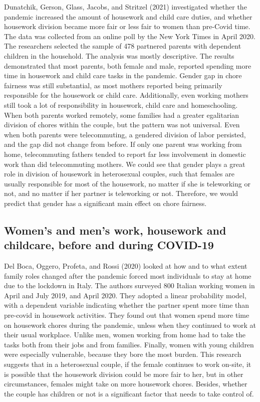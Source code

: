 \documentclass[
  english,
  man]{apa6}
\begin{document}
Dunatchik, Gerson, Glass, Jacobs, and Stritzel (2021) investigated whether the pandemic increased the amount of housework and child care duties, and whether housework division became more fair or less fair to women than pre-Covid time. The data was collected from an online poll by the New York Times in April 2020. The researchers selected the sample of 478 partnered parents with dependent children in the household. The analysis was mostly descriptive. The results demonstrated that most parents, both female and male, reported spending more time in housework and child care tasks in the pandemic. Gender gap in chore fairness was still substantial, as most mothers reported being primarily responsible for the housework or child care. Additionally, even working mothers still took a lot of responsibility in housework, child care and homeschooling. When both parents worked remotely, some families had a greater egalitarian division of chores within the couple, but the pattern was not universal. Even when both parents were telecommuting, a gendered division of labor persisted, and the gap did not change from before. If only one parent was working from home, telecommuting fathers tended to report far less involvement in domestic work than did telecommuting mothers. We could see that gender plays a great role in division of housework in heterosexual couples, such that females are usually responsible for most of the housework, no matter if she is teleworking or not, and no matter if her partner is teleworking or not. Therefore, we would predict that gender has a significant main effect on chore fairness.

\hypertarget{womens-and-mens-work-housework-and-childcare-before-and-during-covid-19}{%
\subsection{Women's and men's work, housework and childcare, before and during COVID-19}\label{womens-and-mens-work-housework-and-childcare-before-and-during-covid-19}}

Del Boca, Oggero, Profeta, and Rossi (2020) looked at how and to what extent family roles changed after the pandemic forced most individuals to stay at home due to the lockdown in Italy. The authors surveyed 800 Italian working women in April and July 2019, and April 2020. They adopted a linear probability model, with a dependent variable indicating whether the partner spent more time than pre-covid in housework activities. They found out that women spend more time on housework chores during the pandemic, unless when they continued to work at their usual workplace. Unlike men, women working from home had to take the tasks both from their jobs and from families. Finally, women with young children were especially vulnerable, because they bore the most burden. This research suggests that in a heterosexual couple, if the female continues to work on-site, it is possible that the housework division could be more fair to her, but in other circumstances, females might take on more housework chores. Besides, whether the couple has children or not is a significant factor that needs to take control of.
\end{document}
